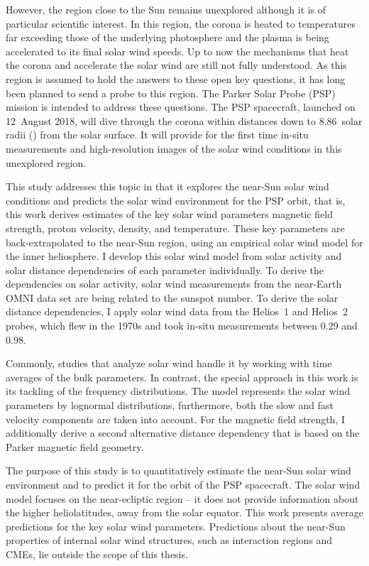 However, the region close to the Sun remains unexplored although it is of particular scientific interest. In this region, the corona is heated to temperatures far exceeding those of the underlying photosphere and the plasma is being accelerated to its final solar wind speeds. Up to now the mechanisms that heat the corona and accelerate the solar wind are still not fully understood.
As this region is assumed to hold the answers to these open key questions, it has long been planned to send a probe to this region. The Parker Solar Probe (PSP) mission is intended to address these questions. The PSP spacecraft, launched on 12~August 2018, will dive through the corona within distances down to \num{8.86}~solar radii (\Rs) from the solar surface. It will provide for the first time in-situ measurements and high-resolution images of the solar wind conditions in this unexplored region.

This study addresses this topic in that it explores the near-Sun solar wind conditions and predicts the solar wind environment for the PSP orbit, that is, this work derives estimates of the key solar wind parameters magnetic field strength, proton velocity, density, and temperature. These key parameters are back-extrapolated to the near-Sun region, using an empirical solar wind model for the inner heliosphere.
I develop this solar wind model from solar activity and solar distance dependencies of each parameter individually. To derive the dependencies on solar activity, solar wind measurements from the near-Earth OMNI data set are being related to the sunspot number. To derive the solar distance dependencies, I apply solar wind data from the Helios~1 and Helios~2 probes, which flew in the 1970s and took in-situ measurements between \SI{0.29}{\au} and \SI{0.98}{\au}.

Commonly, studies that analyze solar wind handle it by working with time averages of the bulk parameters. In contrast, the special approach in this work is its tackling of the frequency distributions. The model represents the solar wind parameters by lognormal distributions, furthermore, both the slow and fast velocity components are taken into account.
For the magnetic field strength, I additionally derive a second alternative distance dependency that is based on the Parker magnetic field geometry.

The purpose of this study is to quantitatively estimate the near-Sun solar wind environment and to predict it for the orbit of the PSP spacecraft.
The solar wind model focuses on the near-ecliptic region -- it does not provide information about the higher heliolatitudes, away from the solar equator.
This work presents average predictions for the key solar wind parameters. Predictions about the near-Sun properties of internal solar wind structures, such as interaction regions and CMEs, lie outside the scope of this thesis.

